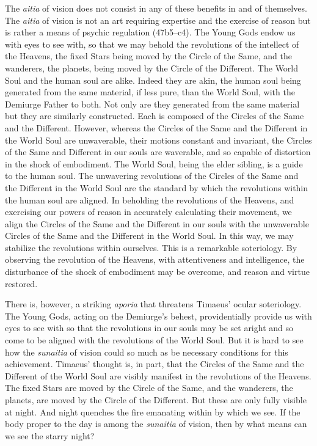 The \emph{aitia} of vision does not consist in any of these benefits in and of themselves. The \emph{aitia} of vision is not an art requiring expertise and the exercise of reason but is rather a means of psychic regulation (47b5--c4). The Young Gods endow us with eyes to see with, so that we may behold the revolutions of the intellect of the Heavens, the fixed Stars being moved by the Circle of the Same, and the wanderers, the planets, being moved by the Circle of the Different. The World Soul and the human soul are alike. Indeed they are akin, the human soul being generated from the same material, if less pure, than the World Soul, with the Demiurge Father to both. Not only are they generated from the same material but they are similarly constructed. Each is composed of the Circles of the Same and the Different. However, whereas the Circles of the Same and the Different in the World Soul are unwaverable, their motions constant and invariant, the Circles of the Same and Different in our souls are waverable, and so capable of distortion in the shock of embodiment. The World Soul, being the elder sibling, is a guide to the human soul. The unwavering revolutions of the Circles of the Same and the Different in the World Soul are the standard by which the revolutions within the human soul are aligned. In beholding the revolutions of the Heavens, and exercising our powers of reason in accurately calculating their movement, we align the Circles of the Same and the Different in our souls with the unwaverable Circles of the Same and the Different in the World Soul. In this way, we may stabilize the revolutions within ourselves. This is a remarkable soteriology. By observing the revolution of the Heavens, with attentiveness and intelligence, the disturbance of the shock of embodiment may be overcome, and reason and virtue restored.

There is, however, a striking \emph{aporia} that threatens Timaeus' ocular soteriology. The Young Gods, acting on the Demiurge's behest, providentially provide us with eyes to see with so that the revolutions in our souls may be set aright and so come to be aligned with the revolutions of the World Soul. But it is hard to see how the \emph{sunaitia} of vision could so much as be necessary conditions for this achievement. Timaeus' thought is, in part, that the Circles of the Same and the Different of the World Soul are visibly manifest in the revolutions of the Heavens. The fixed Stars are moved by the Circle of the Same, and the wanderers, the planets, are moved by the Circle of the Different. But these are only fully visible at night. And night quenches the fire emanating within by which we see. If the body proper to the day is among the \emph{sunaitia} of vision, then by what means can we see the starry night?


